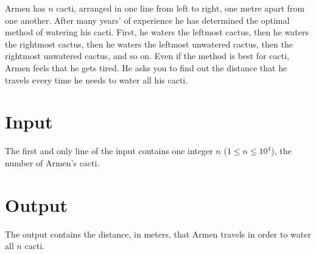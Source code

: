 
Armen has $n$ cacti, arranged in one line from left to right, one metre apart from one another.
After many years’ of experience he has determined the optimal method of watering his cacti.
First, he waters the leftmost cactus, then he waters the rightmost cactus, then he waters the leftmost unwatered cactus, then the rightmost unwatered cactus, and so on.
Even if the method is best for cacti, Armen feels that he gets tired.
He asks you to find out the distance that he travels every time he needs to water all his cacti.

\section*{Input}
The first and only line of the input contains one integer $n$ ($1 \leq n \leq 10^4$), the number of Armen’s cacti.

\section*{Output}
The output contains the distance, in meters, that Armen travels in order to water all $n$ cacti.
